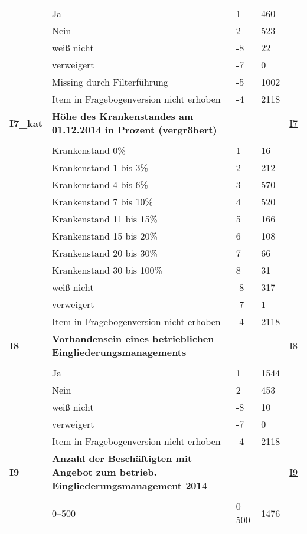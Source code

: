 \begin{longtable}{| L{2.5cm} | L{8.25cm}| C{1.5cm} | R{1.25cm} | C{2.25cm} |  }
   & Ja & 1 & 460 &  \\ 
   & Nein & 2 & 523 &  \\ 
   & weiß nicht & -8 & 22 &  \\ 
   & verweigert & -7 & 0 &  \\ 
   & Missing durch Filterführung & -5 & 1002 &  \\ 
   & Item in Fragebogenversion nicht erhoben & -4 & 2118 &  \\ 
   \midrule
\textbf{I7\_kat}\label{var:suf:I7:kat} & \textbf{Höhe des Krankenstandes am 01.12.2014 in Prozent (vergröbert)} &  &  & \hyperref[I7]{I7} \\ 
   &  &  &  &  \\ 
   & Krankenstand 0\% & 1 & 16 &  \\ 
   & Krankenstand 1 bis 3\% & 2 & 212 &  \\ 
   & Krankenstand 4 bis 6\% & 3 & 570 &  \\ 
   & Krankenstand 7 bis 10\% & 4 & 520 &  \\ 
   & Krankenstand 11 bis 15\% & 5 & 166 &  \\ 
   & Krankenstand 15 bis 20\% & 6 & 108 &  \\ 
   & Krankenstand 20 bis 30\% & 7 & 66 &  \\ 
   & Krankenstand 30 bis 100\% & 8 & 31 &  \\ 
   & weiß nicht & -8 & 317 &  \\ 
   & verweigert & -7 & 1 &  \\ 
   & Item in Fragebogenversion nicht erhoben & -4 & 2118 &  \\ 
   \midrule
\textbf{I8}\label{var:suf:I8} & \textbf{Vorhandensein eines betrieblichen Eingliederungsmanagements} &  &  & \hyperref[I8]{I8} \\ 
   &  &  &  &  \\ 
   & Ja & 1 & 1544 &  \\ 
   & Nein & 2 & 453 &  \\ 
   & weiß nicht & -8 & 10 &  \\ 
   & verweigert & -7 & 0 &  \\ 
   & Item in Fragebogenversion nicht erhoben & -4 & 2118 &  \\ 
   \midrule
\textbf{I9}\label{var:suf:I9} & \textbf{Anzahl der Beschäftigten mit Angebot zum betrieb. Eingliederungsmanagement 2014} &  &  & \hyperref[I9]{I9} \\ 
   &  &  &  &  \\ 
   & 0--500 & 0--500 & 1476 &  \\ 

\end{longtable}
